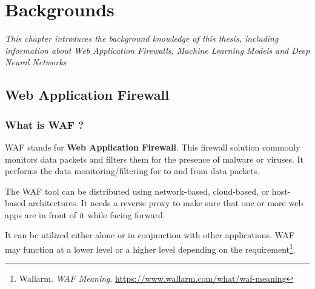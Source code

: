 \chapter{Backgrounds}
\label{chap:backgrounds}
	\textit{This chapter introduces the background knowledge of this thesis, including information about Web Application Firewalls, Machine Learning Models and Deep Neural Networks}
\minitoc

\section{Web Application Firewall} 
\label{sec:waf}
	
\subsection{What is WAF ?}
\label{subsec:waf_def}
WAF stands for \textbf{Web Application Firewall}. This firewall solution commonly monitors data packets and filters them for the presence of malware or viruses. It performs the data monitoring/filtering for to and from data packets.  

The WAF tool can be distributed using network-based, cloud-based, or host-based architectures. It needs a reverse proxy to make sure that one or more web apps are in front of it while facing forward. 

It can be utilized either alone or in conjunction with other applications. WAF may function at a lower level or a higher level depending on the requirement\footnote{\label{wallarm} Wallarm. \textit{WAF Meaning}. \url{https://www.wallarm.com/what/waf-meaning}}.


